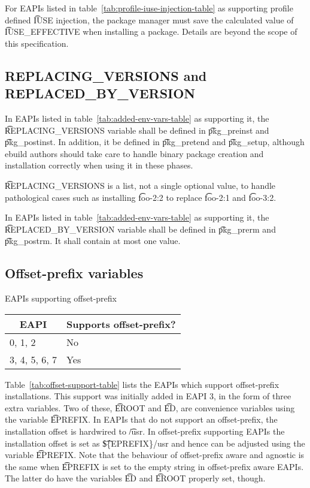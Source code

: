 For EAPIs listed in table~\ref{tab:profile-iuse-injection-table} as supporting profile defined
\t{IUSE} injection, the package manager must save the calculated value of \t{IUSE_EFFECTIVE} when
installing a package. Details are beyond the scope of this specification.

\subsection{REPLACING_VERSIONS and REPLACED_BY_VERSION}
\label{sec:replacing-versions}

 In EAPIs listed in table~\ref{tab:added-env-vars-table} as
supporting it, the \t{REPLACING_VERSIONS} variable shall be defined in \t{pkg_preinst} and
\t{pkg_postinst}.  In addition, it  be defined in \t{pkg_pretend} and \t{pkg_setup},
although ebuild authors should take care to handle binary package creation and installation
correctly when using it in these phases.

\t{REPLACING_VERSIONS} is a list, not a single optional value, to handle pathological cases such as
installing \t{foo-2:2} to replace \t{foo-2:1} and \t{foo-3:2}.

In EAPIs listed in table~\ref{tab:added-env-vars-table} as supporting it, the
\t{REPLACED_BY_VERSION} variable shall be defined in \t{pkg_prerm} and \t{pkg_postrm}. It shall
contain at most one value.

\subsection{Offset-prefix variables}
\label{sec:offset-vars}

\begin{centertable}{EAPIs supporting offset-prefix}
    \label{tab:offset-support-table}
    \begin{tabular}{ll}
      \toprule
      \multicolumn{1}{c}{\textbf{EAPI}} &
      \multicolumn{1}{c}{\textbf{Supports offset-prefix?}}\\
      \midrule
      0, 1, 2           & No  \\
      3, 4, 5, 6, 7     & Yes \\
      \bottomrule
    \end{tabular}
\end{centertable}

 Table~\ref{tab:offset-support-table} lists the EAPIs which
support offset-prefix installations. This support was initially added in EAPI 3, in the form of
three extra variables. Two of these, \t{EROOT} and \t{ED}, are convenience variables using the
variable \t{EPREFIX}\@. In EAPIs that do not support an offset-prefix, the installation offset is
hardwired to \t{/usr}. In offset-prefix supporting EAPIs the installation offset is set as
\t{\$\{EPREFIX\}/usr} and hence can be adjusted using the variable \t{EPREFIX}\@. Note that the
behaviour of offset-prefix aware and agnostic is the same when \t{EPREFIX} is set to the empty
string in offset-prefix aware EAPIs. The latter do have the variables \t{ED} and \t{EROOT} properly
set, though.


